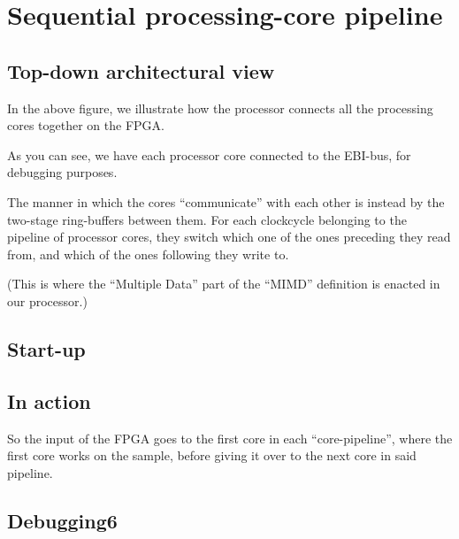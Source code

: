 \FloatBarrier
\section{Sequential processing-core pipeline}\label{section:sequential-pipeline}

\FloatBarrier
\subsection{Top-down architectural view}


In the above figure,  we
illustrate how the processor connects all the processing cores together on the
FPGA.

As you can see, we have each processor core connected to the  EBI-bus, for debugging purposes.

The manner in which the cores ``communicate'' with each other is instead by the
two-stage ring-buffers between them. For each clockcycle belonging to the
pipeline of processor cores, they switch which one of the ones preceding they
read from, and which of the ones following they write to.

(This is where the ``Multiple Data'' part of the ``MIMD'' definition is enacted
in our processor.)

\FloatBarrier
\subsection{Start-up}



\FloatBarrier
\subsection{In action}

So the input of the FPGA goes to the first core in each ``core-pipeline'', where
the first core works on the sample, before giving it over to the next core in
said pipeline.

\FloatBarrier
\subsection{Debugging6}


